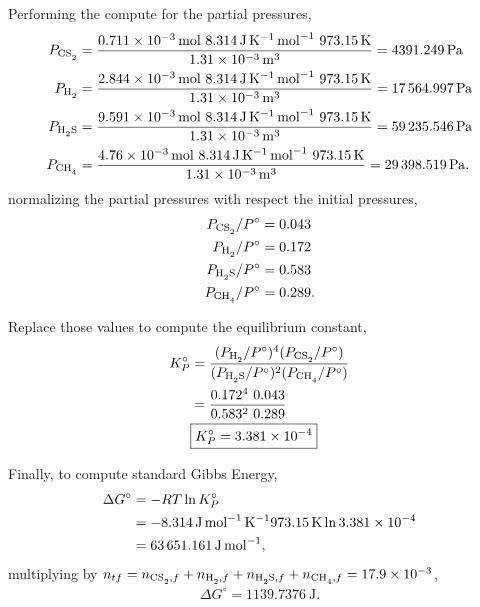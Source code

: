 \documentclass[main.tex]{subfiles}
\begin{document}
Performing the compute for the partial pressures,
\begin{align*}
    P_{\ce{CS2}} &= \frac{\SI{0.711d-3}{\mol}~\SI{8.314}{\joule\per\kelvin\per\mol}~\SI{973.15}{\kelvin}}{\SI{1.31d-3}{\meter\tothe{3}}} = \SI{4391.249}{\pascal}\\
    P_{\ce{H2}} &= \frac{\SI{2.844d-3}{\mol}~\SI{8.314}{\joule\per\kelvin\per\mol}~\SI{973.15}{\kelvin}}{\SI{1.31d-3}{\meter\tothe{3}}} = \SI{17564.997}{\pascal}\\
    P_{\ce{H2S}} &= \frac{\SI{9.591d-3}{\mol}~\SI{8.314}{\joule\per\kelvin\per\mol}~\SI{973.15}{\kelvin}}{\SI{1.31d-3}{\meter\tothe{3}}} = \SI{59235.546}{\pascal}\\
    P_{\ce{CH4}} &= \frac{\SI{4.76d-3}{\mol}~\SI{8.314}{\joule\per\kelvin\per\mol}~\SI{973.15}{\kelvin}}{\SI{1.31d-3}{\meter\tothe{3}}} = \SI{29398.519}{\pascal},
\end{align*}
normalizing the partial pressures with respect the initial pressures,
\begin{align*}
    P_{\ce{CS2}}/P^\circ &= 0.043\\
    P_{\ce{H2}}/P^\circ &= 0.172\\
    P_{\ce{H2S}}/P^\circ &= 0.583\\
    P_{\ce{CH4}}/P^\circ &= 0.289.
\end{align*}

Replace those values to compute the equilibrium constant,
\begin{align*}
    K^\circ_P &= \frac{(P_{\ce{H2}}/P^\circ)^4(P_{\ce{CS2}}/P^\circ)}{(P_{\ce{H2S}}/P^\circ)^2(P_{\ce{CH4}}/P^\circ)} \\
    &= \frac{0.172^4~0.043}{0.583^2~0.289} \\
    &\boxed{K^\circ_P = \SI{3.381d-4}{}}
\end{align*}

Finally, to compute standard Gibbs Energy,
\begin{align*}
    \Delta G^\circ &= -RT\ln K^\circ_P \\
    &= -\SI{8.314}{\joule\per\mol\per\kelvin}\SI{973.15}{\kelvin}\ln\num{3.381d-4} \\
    &= \SI{63651.161}{\joule\per\mol},
\end{align*}
multiplying by $n_{tf}=n_{\ce{CS2},f}+n_{\ce{H2},f} +n_{\ce{H2S},f}+n_{\ce{CH4},f}=\num{17.9d-3}$,
\begin{gather*}
    \boxed{\Delta G^\circ = \SI{1139.7376}{\joule}}.
\end{gather*}




\end{document}
